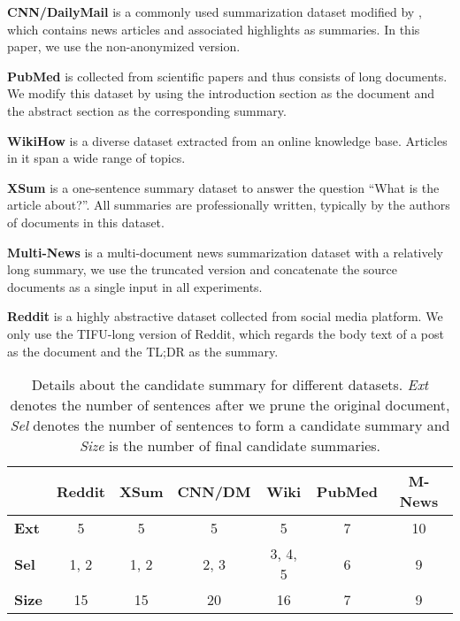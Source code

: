 \documentclass[11pt,a4paper]{article}
\begin{document}
\textbf{CNN/DailyMail} \cite{hermann2015teaching} is a commonly used summarization dataset modified by \citet{nallapati2016abstractive}, which contains news articles and
associated highlights as summaries. In this paper, we use the non-anonymized version.

\textbf{PubMed} \cite{cohan2018discourse} is collected from scientific papers and thus consists of long documents. We modify this dataset by using the introduction section as the document and the abstract section as the corresponding summary.

\textbf{WikiHow} \cite{koupaee2018wikihow} is a diverse dataset extracted from an online knowledge base. Articles in it span a wide range of topics.

\textbf{XSum} \cite{narayan2018don} is a one-sentence summary dataset to answer the question ``What is the article about?''. All summaries are professionally written, typically by the authors of documents in this dataset.

\textbf{Multi-News} \cite{DBLP:conf/acl/FabbriLSLR19} is a multi-document news summarization dataset with a relatively long summary, we use the truncated version and concatenate the source documents as a single input in all experiments.

\textbf{Reddit} \cite{kim2019abstractive} is a highly abstractive dataset collected from social media platform. We only use the TIFU-long version of Reddit, which regards the body text of a post as the document and the TL;DR as the summary.

\renewcommand\arraystretch{1.3}
\begin{table}[t]\footnotesize\setlength{\tabcolsep}{2.3pt}
  \centering
    \begin{tabular}{lcccccc}
    \toprule
      & \textbf{Reddit} & \textbf{XSum} & \textbf{CNN/DM} & \textbf{Wiki} & \textbf{PubMed} & \textbf{M-News} \\
    \midrule
    \textbf{Ext} & 5 & 5 & 5 & 5 & 7 & 10 \\
    \textbf{Sel} & 1, 2 & 1, 2 & 2, 3 & 3, 4, 5 & 6 & 9 \\
    \textbf{Size} & 15 & 15 & 20 & 16 & 7 & 9 \\
    \bottomrule
    \end{tabular}\caption{Details about the candidate summary for different datasets. \textit{Ext} denotes the number of sentences after we prune the original document, \textit{Sel} denotes the number of sentences to form a candidate summary and \textit{Size} is the number of final candidate summaries.}
  \label{tab:candidate size}
\end{table}
\end{document}
